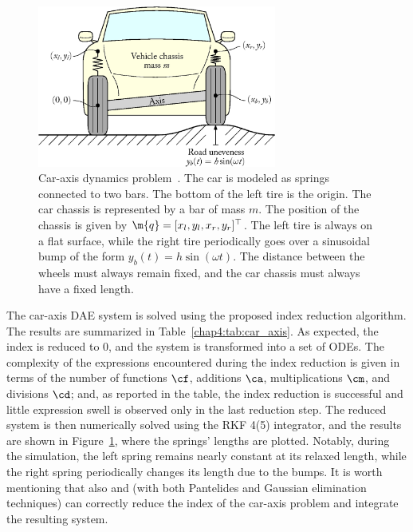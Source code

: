 \begin{figure}
  \centering
  \includegraphics[width=0.7\textwidth]{figures/chapter_4/car_axis}
  \caption{Car-axis dynamics problem~\cite{lioen1998test, mazzia2008test}. The car is modeled as springs connected to two bars. The bottom of the left tire is the origin. The car chassis is represented by a bar of mass $m$. The position of the chassis is given by $\m{q} = [x_l, y_l, x_r, y_r]^\top$. The left tire is always on a flat surface, while the right tire periodically goes over a sinusoidal bump of the form $y_b(t) = h\sin(\omega t)$. The distance between the wheels must always remain fixed, and the car chassis must always have a fixed length.}
  \label{chap4:fig:car_axis}
\end{figure}

The car-axis \ac{DAE} system is solved using the proposed index reduction algorithm. The results are summarized in Table~\ref{chap4:tab:car_axis}. As expected, the index is reduced to 0, and the system is transformed into a set of \acp{ODE}. The complexity of the expressions encountered during the index reduction is given in terms of the number of functions $\cf$, additions $\ca$, multiplications $\cm$, and divisions $\cd$; and, as reported in the table, the index reduction is successful and little expression swell is observed only in the last reduction step. The reduced system is then numerically solved using the \ac{RKF} 4(5) integrator, and the results are shown in Figure~\ref{chap4:fig:car_axis}, where the springs' lengths are plotted. Notably, during the simulation, the left spring remains nearly constant at its relaxed length, while the right spring periodically changes its length due to the bumps. It is worth mentioning that also \Mathematica{} and \Matlab{} (with both Pantelides and Gaussian elimination techniques) can correctly reduce the index of the car-axis problem and integrate the resulting system.

